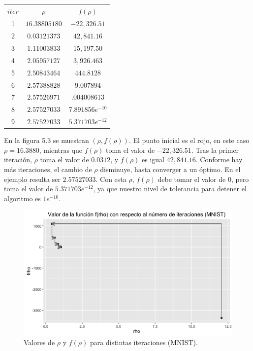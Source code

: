 \begin{center}
\begin{tabular}{ | c | c|  c |} 
\hline
$iter$ & $\rho$ & $f(\rho)$  \\ 
\hline
\hline
1 & $16.38805180$ & $-22,326.51$  \\ 
\hline
2 & $0.03121373$ & $42,841.16$  \\ 
\hline
3 & $1.11003833$ & $15,197.50$  \\ 
\hline
4 & $2.05957127$ & $3,926.463$  \\ 
\hline
5 & $2.50843464$ & $444.8128$  \\ 
\hline
6 & $2.57388828$ & $9.007894$  \\ 
\hline
7 & $2.57526971$ & $.004008613$  \\ 
\hline
8 & $2.57527033$ & $7.891856e^{-10}$  \\ 
\hline
9 & $2.57527033$ & $5.371703e^{-12}$  \\ 
\hline
\hline

\end{tabular}
\end{center}

En la figura 5.3 se muestran $(\rho, f(\rho))$. El punto inicial es el rojo, en este caso $\rho = 16.3880$, mientras que $f(\rho)$ toma el valor de $-22,326.51$. Tras la primer iteración, $\rho$ toma el valor de $0.0312$, y $f(\rho)$ es igual $42,841.16$. Conforme hay más iteraciones, el cambio de $\rho$ disminuye, hasta converger a un óptimo. En el ejemplo resulta ser $2.57527033$. Con esta $\rho$, $f(\rho)$ debe tomar el valor de 0, pero toma el valor de $5.371703e^{-12}$, ya que nuestro nivel de tolerancia para detener el algoritmo es $1e^{-10}$.

\begin{figure}[!ht]
  \centering
	\includegraphics[width=1\textwidth]{Figures/Chapter4_Iteraciones.png}	
  \caption{Valores de $\rho$ y $f(\rho)$ para distintas iteraciones (MNIST).}
\end{figure}

